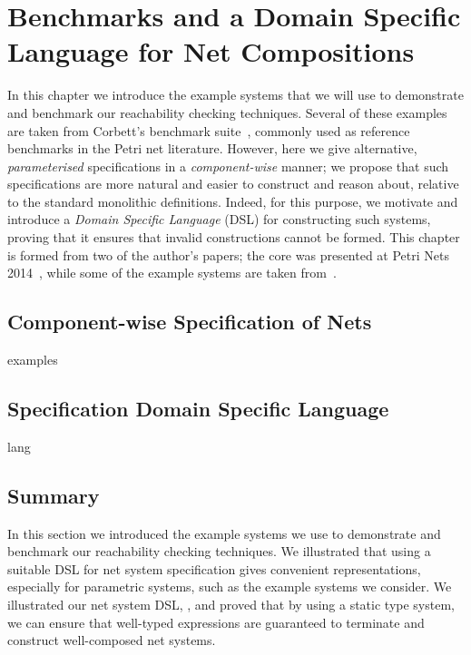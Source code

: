 \chapter{Benchmarks and a Domain Specific Language for Net Compositions} \label{chp:benchmarksAndLang}

In this chapter we introduce the example systems that we will use to
demonstrate and benchmark our reachability checking techniques. Several of
these examples are taken from Corbett's benchmark suite~\cite{Corbett1996},
commonly used as reference benchmarks in the Petri net literature. However,
here we give alternative, \emph{parameterised} specifications in a
\emph{component-wise} manner; we propose that such specifications are more
natural and easier to construct and reason about, relative to the standard
monolithic definitions. Indeed, for this purpose, we motivate and introduce a
\emph{Domain Specific Language} (DSL) for constructing such systems, proving
that it ensures that invalid constructions cannot be formed. This chapter is
formed from two of the author's papers; the core was presented at Petri Nets
2014~\cite{Sobocinski2014}, while some of the example systems are taken
from~\cite{Rathke2013}.

\section{Component-wise Specification of Nets}
\label{sec:benchmarks}
{examples}

\section{Specification Domain Specific Language}
\label{sec:lang}
{lang}

\section{Summary}
In this section we introduced the example systems we use to demonstrate and
benchmark our reachability checking techniques. We illustrated that using a
suitable DSL for net system specification gives convenient representations,
especially for parametric systems, such as the example systems we consider. We
illustrated our net system DSL, \DSL{}, and proved that by using a static type
system, we can ensure that well-typed expressions are guaranteed to terminate
and construct well-composed net systems.
